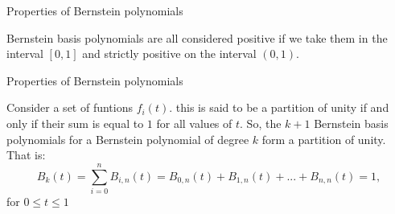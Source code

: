 \documentclass{beamer}
\begin{document}
\begin{frame}{Properties of Bernstein polynomials}
\begin{theorem}[Positivity]
Bernstein basis polynomials are all considered positive if we take them in the interval $[0,1]$ and strictly positive on the interval $(0,1)$.
\end{theorem}    
\end{frame}
\begin{frame}{Properties of Bernstein polynomials}
\begin{theorem}
Consider a set of funtions $f_i(t)$. this is said to be a partition of unity if and only if their sum is equal to $1$ for all values of $t$. So, the $k + 1$ Bernstein basis polynomials for a Bernstein polynomial of degree $k$ form a partition of unity. That is:
\begin{equation*}
B_k(t)=\sum_{i=0}^nB_{i,n}(t)= B_{0,n}(t)+B_{1,n}(t)+...+B_{n,n}(t)=1,
\end{equation*}
for $0\leq t\leq 1$  
\end{theorem}    
\end{frame}
\end{document}
